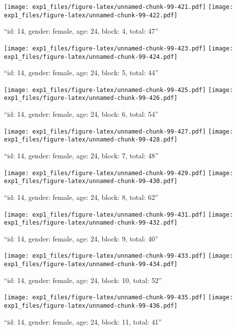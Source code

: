 \documentclass[,]{article}
\begin{document}
\texttt{[image: exp1\_files/figure-latex/unnamed-chunk-99-421.pdf]}
\texttt{[image: exp1\_files/figure-latex/unnamed-chunk-99-422.pdf]}

\newpage
[1] 

``id: 14, gender: female, age: 24, block: 4, total: 47''

\texttt{[image: exp1\_files/figure-latex/unnamed-chunk-99-423.pdf]}
\texttt{[image: exp1\_files/figure-latex/unnamed-chunk-99-424.pdf]}

\newpage
[1] 

``id: 14, gender: female, age: 24, block: 5, total: 44''

\texttt{[image: exp1\_files/figure-latex/unnamed-chunk-99-425.pdf]}
\texttt{[image: exp1\_files/figure-latex/unnamed-chunk-99-426.pdf]}

\newpage
[1] 

``id: 14, gender: female, age: 24, block: 6, total: 54''

\texttt{[image: exp1\_files/figure-latex/unnamed-chunk-99-427.pdf]}
\texttt{[image: exp1\_files/figure-latex/unnamed-chunk-99-428.pdf]}

\newpage
[1] 

``id: 14, gender: female, age: 24, block: 7, total: 48''

\texttt{[image: exp1\_files/figure-latex/unnamed-chunk-99-429.pdf]}
\texttt{[image: exp1\_files/figure-latex/unnamed-chunk-99-430.pdf]}

\newpage
[1] 

``id: 14, gender: female, age: 24, block: 8, total: 62''

\texttt{[image: exp1\_files/figure-latex/unnamed-chunk-99-431.pdf]}
\texttt{[image: exp1\_files/figure-latex/unnamed-chunk-99-432.pdf]}

\newpage
[1] 

``id: 14, gender: female, age: 24, block: 9, total: 40''

\texttt{[image: exp1\_files/figure-latex/unnamed-chunk-99-433.pdf]}
\texttt{[image: exp1\_files/figure-latex/unnamed-chunk-99-434.pdf]}

\newpage
[1] 

``id: 14, gender: female, age: 24, block: 10, total: 52''

\texttt{[image: exp1\_files/figure-latex/unnamed-chunk-99-435.pdf]}
\texttt{[image: exp1\_files/figure-latex/unnamed-chunk-99-436.pdf]}

\newpage
[1] 

``id: 14, gender: female, age: 24, block: 11, total: 41''
\end{document}

